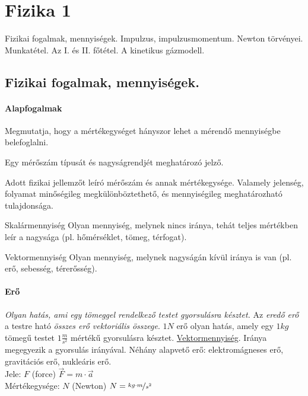 \section{Fizika 1}
{\footnotesize Fizikai fogalmak, mennyiségek. Impulzus, impulzusmomentum. Newton törvényei. Munkatétel. Az I. és II. főtétel. A kinetikus gázmodell.}
\subsection{Fizikai fogalmak, mennyiségek.}
\paragraph{Alapfogalmak}
\begin{description}[nosep]
	\item[Mérőszám] Megmutatja, hogy a mértékegységet hányszor lehet a mérendő mennyiségbe belefoglalni.
	\item[Mértékegység] Egy mérőszám típusát és nagyságrendjét meghatározó jelző.
	\item[Fizikai mennyiség] Adott fizikai jellemzőt leíró mérőszám és annak mértékegysége. Valamely jelenség, folyamat minőségileg megkülönböztethető, és mennyiségileg meghatározható tulajdonsága.
	\begin{enumdescript}[nosep]
		\item[Skalármennyiség] Olyan mennyiség, melynek nincs iránya, tehát teljes mértékben leír a nagysága (pl. hőmérséklet, tömeg, térfogat).
		\item[Vektormennyiség] Olyan mennyiség, melynek nagyságán kívül iránya is van (pl. erő, sebesség, térerősség).
	\end{enumdescript}
\end{description}

\paragraph{Erő}
\emph{Olyan hatás, ami egy tömeggel rendelkező testet gyorsulásra késztet.} Az \emph{eredő erő} a testre ható \emph{összes erő vektoriális összege}. $1N$ erő olyan hatás, amely egy $1kg$$  $ tömegű testet $1\frac{m}{s^2}$ mértékű gyorsulásra késztet. \underline{Vektormennyiség}. Iránya megegyezik a gyorsulás irányával. Néhány alapvető erő: elektromágneses erő, gravitációs erő, nukleáris erő.\\
Jele: $F$ (force) \quad $\vec{F} = m \cdot \vec{a}$\\
Mértékegysége: $N$ (Newton) \quad $ N = \nicefrac{kg\cdot m}{s^2} $

